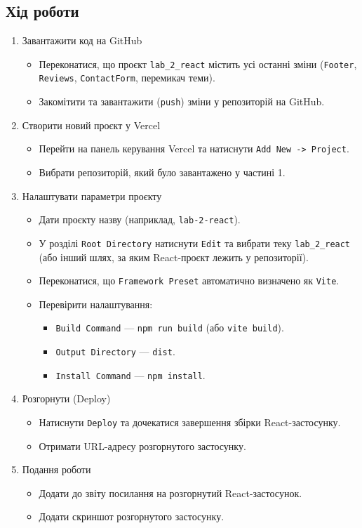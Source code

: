 \documentclass[12pt, a4paper]{article}
\begin{document}
\subsection{Хід роботи}
\begin{enumerate}
	\item Завантажити код на GitHub
		\begin{itemize}
			\item Переконатися, що проєкт \verb|lab_2_react| містить усі останні зміни (\verb|Footer|, \verb|Reviews|, \verb|ContactForm|, перемикач теми).
			\item Закомітити та завантажити (\verb|push|) зміни у репозиторій на GitHub.
		\end{itemize}
	\item Створити новий проєкт у Vercel
		\begin{itemize}
			\item Перейти на панель керування Vercel та натиснути \verb|Add New -> Project|.
			\item Вибрати репозиторій, який було завантажено у частині 1.
		\end{itemize}
	\item Налаштувати параметри проєкту
		\begin{itemize}
			\item Дати проєкту назву (наприклад, \verb|lab-2-react|).
			\item У розділі \verb|Root Directory| натиснути \verb|Edit| та вибрати теку \verb|lab_2_react| (або інший шлях, за яким React-проєкт лежить у репозиторії).
			\item Переконатися, що \verb|Framework Preset| автоматично визначено як \verb|Vite|.
			\item Перевірити налаштування:
				\begin{itemize}
					\item \verb|Build Command| --- \verb|npm run build| (або \verb|vite build|).
					\item \verb|Output Directory| --- \verb|dist|.
					\item \verb|Install Command| --- \verb|npm install|.
				\end{itemize}
		\end{itemize}
	\item Розгорнути (Deploy)
		\begin{itemize}
			\item Натиснути \verb|Deploy| та дочекатися завершення збірки React-застосунку.
			\item Отримати URL-адресу розгорнутого застосунку.
		\end{itemize}
	\item Подання роботи
		\begin{itemize}
			\item Додати до звіту посилання на розгорнутий React-застосунок.
			\item Додати скриншот розгорнутого застосунку.
		\end{itemize}
\end{enumerate}
\end{document}
